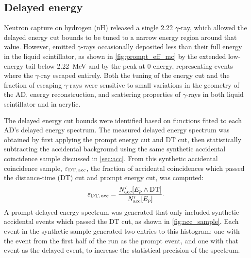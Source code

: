 \subsection{Delayed energy}
\label{subsec:delayed}

Neutron capture on hydrogen (nH) released a single
\SI{2.22}{\mev} $\gamma$-ray,
which allowed the delayed energy cut bounds to be tuned to a narrow energy region
around that value.
However, emitted $\gamma$-rays occasionally
deposited less than their full energy in the liquid scintillator,
as shown in \cref{fig:prompt_eff_mc} by the extended low-energy tail
below \SI{2.22}{\MeV} and by the peak at 0 energy,
representing events where the $\gamma$-ray escaped entirely.
Both the tuning of the energy cut
and the fraction of escaping $\gamma$-rays were sensitive to
small variations in the geometry of the AD, energy reconstruction,
and scattering properties of $\gamma$-rays in
both liquid scintillator and in acrylic.

The delayed energy cut bounds were identified based on
functions fitted to each AD's delayed energy spectrum.
The measured delayed energy spectrum was obtained by first applying
the prompt energy cut and DT cut,
then statistically subtracting the accidental background
using the same synthetic accidental coincidence sample
discussed in \cref{sec:acc}.
From this synthetic accidental coincidence sample, $\varepsilon_{\text{DT,\,acc}}$,
the fraction of accidental  coincidences which passed the distance-time (DT) cut
and prompt energy cut, was computed:
\begin{equation}\label{eq:eps_DT_acc}
    \varepsilon_{\text{DT,\,acc}} =
    \frac{N_\text{acc}'[E_p \wedge \text{DT}]}{N_\text{acc}'[E_p]}.
\end{equation}
A prompt-delayed energy spectrum was generated that only included
synthetic accidental events which passed the DT cut,
as shown in \cref{fig:acc_sample}.
Each event in the synthetic sample generated two entries to this histogram:
one with the event from the first half of the run as the prompt event,
and one with that event as the delayed event,
to increase the statistical precision of the spectrum.

